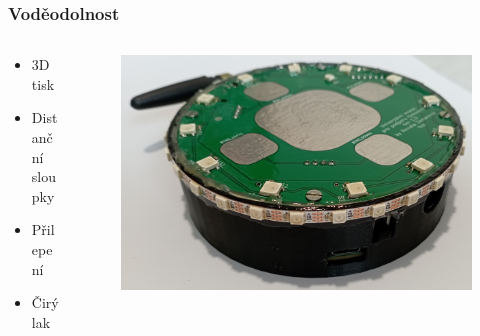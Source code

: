 \documentclass[%
  12pt,       				%
	t,                  %
	aspectratio=1610,   %
	unicode,						%
]{beamer}				    	%
\begin{document}
\begin{frame}
	\frametitle{Voděodolnost}
	\begin{columns}[T] 	
		\begin{column}{0.3\textwidth}	
			\begin{itemize}
				\item 3D tisk 
				\item Distanční sloupky 
				\item Přilepení 
				\item Čirý lak
			\end{itemize}
		\end{column}

		\begin{column}{0.7\textwidth}	
			\begin{figure}%
				\centering	          
				\includegraphics[width=1\columnwidth]{obrazky/v_krabicce_bok.jpg}
			\end{figure}
		\end{column}
	\end{columns}
\end{frame}
\end{document}
